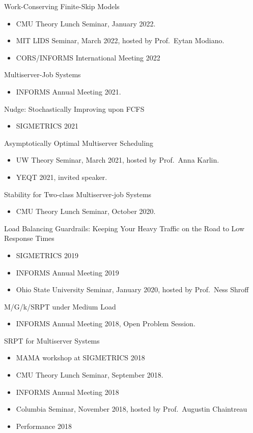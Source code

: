 \documentclass{res}
\begin{document}
\begin{resume}
    Work-Conserving Finite-Skip Models
    \begin{itemize}
        \item CMU Theory Lunch Seminar, January 2022.
        \item MIT LIDS Seminar, March 2022, hosted by Prof.~Eytan Modiano.
        \item CORS/INFORMS International Meeting 2022
    \end{itemize}

    Multiserver-Job Systems
    \begin{itemize}
        \item INFORMS Annual Meeting 2021.
    \end{itemize}

    Nudge: Stochastically Improving upon FCFS
    \begin{itemize}
        \item SIGMETRICS 2021 
    \end{itemize}

    Asymptotically Optimal Multiserver Scheduling
    \begin{itemize}
        \item UW Theory Seminar, March 2021, hosted by Prof.~Anna Karlin.
        \item YEQT 2021, invited speaker.
    \end{itemize}

    Stability for Two-class Multiserver-job Systems
    \begin{itemize}
        \item CMU Theory Lunch Seminar, October 2020.
    \end{itemize}

    Load Balancing Guardrails: Keeping Your Heavy Traffic on the Road to Low Response Times
    \begin{itemize}
        \item SIGMETRICS 2019
        \item INFORMS Annual Meeting 2019
        \item Ohio State University Seminar, January 2020, hosted by Prof.~Ness Shroff
    \end{itemize}

    M/G/k/SRPT under Medium Load
    \begin{itemize}
        \item INFORMS Annual Meeting 2018, Open Problem Session.
    \end{itemize}

    SRPT for Multiserver Systems
    \begin{itemize}
        \item MAMA workshop at SIGMETRICS 2018
        \item CMU Theory Lunch Seminar, September 2018.
        \item INFORMS Annual Meeting 2018
        \item Columbia Seminar, November 2018, hosted by Prof.~Augustin Chaintreau
        \item Performance 2018
    \end{itemize}


\end{resume}
\end{document}
